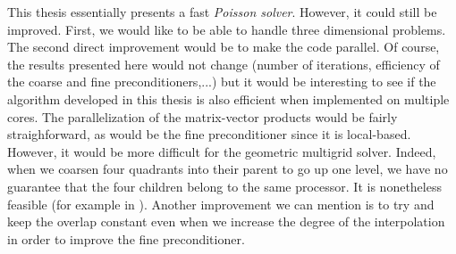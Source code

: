 This thesis essentially presents a fast \textit{Poisson solver}. However, it could still be improved. First, we would like to be able to handle three dimensional problems. The second direct improvement would be to make the code parallel. Of course, the results presented here would not change (number of iterations, efficiency of the coarse and fine preconditioners,...) but it would be interesting to see if the algorithm developed in this thesis is also efficient when implemented on multiple cores. The parallelization of the matrix-vector products would be fairly straighforward, as would be the fine preconditioner since it is local-based. However, it would be more difficult for the geometric multigrid solver. Indeed, when we coarsen four quadrants into their parent to go up one level, we have no guarantee that the four children belong to the same processor. It is nonetheless feasible (for example in \cite{multi_impl}). Another improvement we can mention is to try and keep the overlap constant even when we increase the degree of the interpolation in order to improve the fine preconditioner. 




